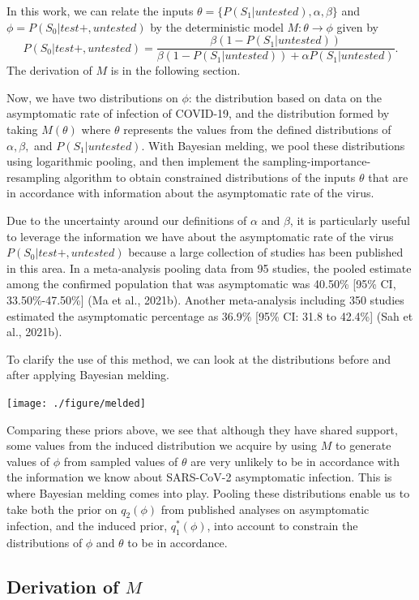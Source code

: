 \documentclass[12pt,twoside]{smiththesis}
\begin{document}
In this work, we can relate the inputs \(\theta = \{P(S_1|untested), \alpha, \beta \}\) and \(\phi = P(S_0|test +,untested)\) by the deterministic model \(M: \theta \to \phi\) given by
\[P(S_0|test+, untested) = \frac{\beta(1 - P(S_1|untested))}{\beta(1-P(S_1|untested)) + \alpha P(S_1|untested)}.\] The derivation of \(M\) is in the following section.

Now, we have two distributions on \(\phi\): the distribution based on data on the asymptomatic rate of infection of COVID-19, and the distribution formed by taking \(M(\theta)\) where \(\theta\) represents the values from the defined distributions of \(\alpha,\beta,\) and \(P(S_1|untested)\). With Bayesian melding, we pool these distributions using logarithmic pooling, and then implement the sampling-importance-resampling algorithm to obtain constrained distributions of the inputs \(\theta\) that are in accordance with information about the asymptomatic rate of the virus.

Due to the uncertainty around our definitions of \(\alpha\) and \(\beta\), it is particularly useful to leverage the information we have about the asymptomatic rate of the virus \(P(S_0|test +,untested)\) because a large collection of studies has been published in this area. In a meta-analysis pooling data from 95 studies, the pooled estimate among the confirmed population that was asymptomatic was 40.50\% {[}95\% CI, 33.50\%-47.50\%{]} (Ma et al., 2021b). Another meta-analysis including 350 studies estimated the asymptomatic percentage as 36.9\% {[}95\% CI: 31.8 to 42.4\%{]} (Sah et al., 2021b).

To clarify the use of this method, we can look at the distributions before and after applying Bayesian melding.

\texttt{[image: ./figure/melded]}

Comparing these priors above, we see that although they have shared support, some values from the induced distribution we acquire by using \(M\) to generate values of \(\phi\) from sampled values of \(\theta\) are very unlikely to be in accordance with the information we know about SARS-CoV-2 asymptomatic infection. This is where Bayesian melding comes into play. Pooling these distributions enable us to take both the prior on \(q_2(\phi)\) from published analyses on asymptomatic infection, and the induced prior, \(q_1^*(\phi)\), into account to constrain the distributions of \(\phi\) and \(\theta\) to be in accordance.

\hypertarget{derivation-of-m}{%
\subsection{\texorpdfstring{Derivation of \(M\)}{Derivation of M}}\label{derivation-of-m}}
\end{document}
